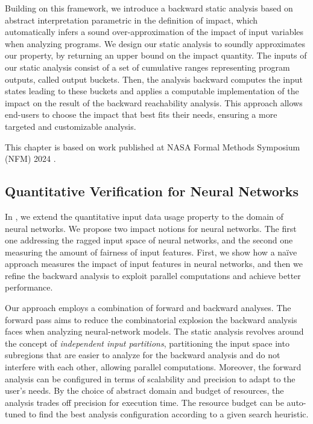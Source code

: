 Building on this framework, we introduce a backward static analysis based on abstract interpretation parametric in the definition of impact, which automatically infers a sound over-approximation of the impact of input variables when analyzing programs. We design our static analysis to soundly approximates our property, by returning an upper bound on the impact quantity.
The inputs of our static analysis consist of a set of cumulative ranges representing program outputs, called output buckets.
Then, the analysis backward computes the input states leading to these buckets and applies a computable implementation of the impact on the result of the backward reachability analysis.
This approach allows end-users to choose the impact that best fits their needs, ensuring a more targeted and customizable analysis.

This chapter is based on work published at NASA Formal Methods Symposium
(NFM) 2024 .


\subsection{Quantitative Verification for Neural Networks}

In , we extend the quantitative input data usage property to the domain of neural networks.
We propose two impact notions for neural networks. The first one addressing the ragged input space of neural networks, and the second one measuring the amount of fairness of input features.
First, we show how a na\"ive approach measures the impact of input features in neural networks, and then we refine the backward analysis to exploit parallel computations and achieve better performance.

Our approach employs a combination of forward and backward analyses.
The forward pass aims to reduce the combinatorial explosion the backward analysis faces when analyzing neural-network models.
The static analysis revolves around the concept of \emph{independent input partitions}, partitioning the input space into subregions that are easier to analyze for the backward analysis and do not interfere with each other, allowing parallel computations.
Moreover, the forward analysis can be configured in terms of scalability and precision to adapt to the user's needs. By the choice of abstract domain and budget of resources, the analysis trades off precision for execution time.
The resource budget can be auto-tuned to find the best analysis configuration according to a given search heuristic.

